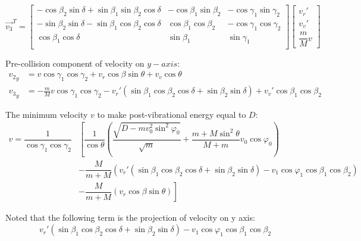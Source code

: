 \documentclass[11pt,letterpaper]{article}
\renewcommand{\phi}{\varphi}
\begin{document}
\begin{equation}
\vec{v_3}^T =     \begin{bmatrix}
-\cos \beta_2 \sin \delta +\sin \beta_1 \sin \beta_2 \cos \delta  & -\cos \beta_1 \sin \beta_2 & -\cos \gamma_1 \sin \gamma_2 \\
-\sin \beta_2 \sin \delta -\sin \beta_1 \cos \beta_2 \cos \delta  & \cos \beta_1 \cos \beta_2 & - \cos \gamma_1 \cos \gamma_2 \\
\cos \beta_1 \cos \delta   & \sin \beta_1 & \sin \gamma_1  \\
\end{bmatrix}  \begin{bmatrix}
v_{r}' \\
v_v'\\
\dfrac{m}{M}v
\end{bmatrix}
\end{equation}

Pre-collision component of velocity on $ y-axis $:
\begin{equation}
\begin{aligned}
{v_2}_y &= v \cos \gamma _1 \cos \gamma _2+ v_r \cos \beta  \sin \theta +v_v \cos \theta\\
{v_3}_y &=-\frac{m }{M} v \cos \gamma _1 \cos \gamma_2 -  v_r'\left(\sin \beta _1 \cos\beta_2\cos \delta + \sin\beta_2\sin \delta \right)+ v_v' \cos \beta _1 \cos\beta _2
\end{aligned}
\end{equation}

The minimum velocity $ v $ to make post-vibrational energy equal to $ D $:
\begin{equation}
\begin{aligned}
v = \dfrac{1}{\cos \gamma_1 \cos \gamma_2}& \left[\dfrac{1}{\cos \theta} \left( \dfrac{\sqrt{D- m v_0^2 \sin^2 \phi_0} }{\sqrt{m}} + \dfrac{m+M\sin^2 \theta}{M+m} v_0 \cos \phi_0   \right)  \right.\\
& -\left. \dfrac{M}{m+M} \left(v_r'\left(\sin \beta _1 \cos\beta_2\cos \delta + \sin\beta_2\sin \delta \right)- v_1 \cos \phi_1 \cos \beta _1 \cos\beta _2 \right) \right. \\
& -\left. \dfrac{M}{m+M} \left(v_r \cos \beta \sin \theta \right) \right]
\end{aligned}
\end{equation}

Noted that the following term is the projection of velocity on y axis:
\begin{equation}
\boxed{
v_r'\left(\sin \beta _1 \cos\beta_2\cos \delta + \sin\beta_2\sin \delta\right)- v_1 \cos \phi_1 \cos \beta _1 \cos\beta _2}
\end{equation}
\end{document}
